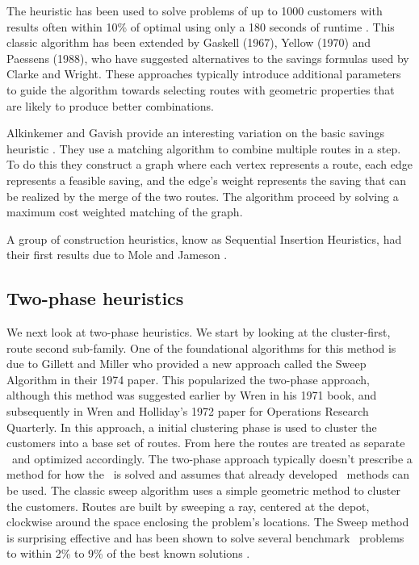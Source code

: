 The heuristic has been used to solve problems of up to 1000 customers with results often within 10\% of optimal using only a 180 seconds of runtime \cite{TV2001}. This classic algorithm has been extended by Gaskell (1967), Yellow (1970) and Paessens (1988), who have suggested alternatives to the savings formulas used by Clarke and Wright. These approaches typically introduce additional parameters to guide the algorithm towards selecting routes with geometric properties that are likely to produce better combinations.

Alkinkemer and Gavish provide an interesting variation on the basic savings heuristic \cite{AG:1991}. They use a matching algorithm to combine multiple routes in a step. To do this they construct a graph where each vertex represents a route, each edge represents a feasible saving, and the edge's weight represents the saving that can be realized by the merge of the two routes. The algorithm proceed by solving a maximum cost weighted matching of the graph.

A group of construction heuristics, know as Sequential Insertion Heuristics, had their first results due to Mole and Jameson \cite{MJ:1976}.

\subsection{Two-phase heuristics}
\label{twophaseheuristics}

We next look at two-phase heuristics. We start by looking at the cluster-first, route second sub-family. One of the foundational algorithms for this method is due to Gillett and Miller who provided a new approach called the Sweep Algorithm in their 1974 paper\cite{GM:1974}. This popularized the two-phase approach, although this method was suggested earlier by Wren in his 1971 book, and subsequently in Wren and Holliday's 1972 paper for Operations Research Quarterly. In this approach, a initial clustering phase is used to cluster the customers into a base set of routes. From here the routes are treated as separate \TSP\ and optimized accordingly. The two-phase approach typically doesn't prescribe a method for how the \TSP\ is solved and assumes that already developed \TSP\ methods can be used. The classic sweep algorithm uses a simple geometric method to cluster the customers. Routes are built by sweeping a ray, centered at the depot, clockwise around the space enclosing the problem's locations. The Sweep method is surprising effective and has been shown to solve several benchmark \VRP\ problems to within 2\% to 9\% of the best known solutions \cite{TV2001}.

